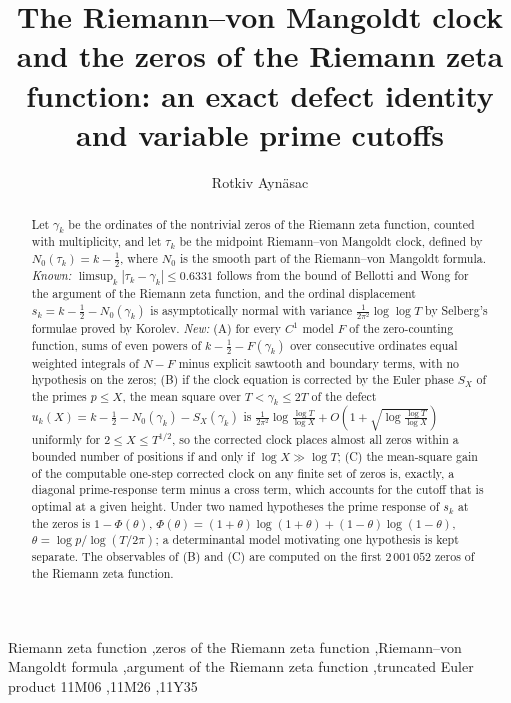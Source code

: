 \documentclass[preprint,12pt]{elsarticle}
\numberwithin{equation}{section}
\theoremstyle{plain}
\theoremstyle{definition}
\theoremstyle{remark}
\newcommand{\NO}{N_0}
\begin{document}
\begin{frontmatter}
\title{The Riemann--von Mangoldt clock and the zeros of the Riemann zeta function: an exact defect identity and variable prime cutoffs}
\author{Rotkiv Ayn\"asac}

\begin{abstract}
Let $\gamma_k$ be the ordinates of the nontrivial zeros of the Riemann zeta function, counted with multiplicity, and let $\tau_k$ be the midpoint Riemann--von Mangoldt clock, defined by $\NO(\tau_k)=k-\frac12$, where $\NO$ is the smooth part of the Riemann--von Mangoldt formula. \emph{Known:} $\limsup_k|\tau_k-\gamma_k|\le0.6331$ follows from the bound of Bellotti and Wong for the argument of the Riemann zeta function, and the ordinal displacement $s_k=k-\frac12-\NO(\gamma_k)$ is asymptotically normal with variance $\frac1{2\pi^2}\log\log T$ by Selberg's formulae proved by Korolev. \emph{New:} (A) for every $C^1$ model $F$ of the zero-counting function, sums of even powers of $k-\frac12-F(\gamma_k)$ over consecutive ordinates equal weighted integrals of $N-F$ minus explicit sawtooth and boundary terms, with no hypothesis on the zeros; (B) if the clock equation is corrected by the Euler phase $S_X$ of the primes $p\le X$, the mean square over $T<\gamma_k\le2T$ of the defect $u_k(X)=k-\frac12-\NO(\gamma_k)-S_X(\gamma_k)$ is $\frac1{2\pi^2}\log\frac{\log T}{\log X}+O(1+\sqrt{\log\frac{\log T}{\log X}})$ uniformly for $2\le X\le T^{1/2}$, so the corrected clock places almost all zeros within a bounded number of positions if and only if $\log X\gg\log T$; (C) the mean-square gain of the computable one-step corrected clock on any finite set of zeros is, exactly, a diagonal prime-response term minus a cross term, which accounts for the cutoff that is optimal at a given height. Under two named hypotheses the prime response of $s_k$ at the zeros is $1-\Phi(\theta)$, $\Phi(\theta)=(1+\theta)\log(1+\theta)+(1-\theta)\log(1-\theta)$, $\theta=\log p/\log(T/2\pi)$; a determinantal model motivating one hypothesis is kept separate. The observables of (B) and (C) are computed on the first $2\,001\,052$ zeros of the Riemann zeta function.
\end{abstract}

\begin{keyword}
Riemann zeta function \sep zeros of the Riemann zeta function \sep Riemann--von Mangoldt formula \sep argument of the Riemann zeta function \sep truncated Euler product
\MSC[2020] 11M06 \sep 11M26 \sep 11Y35
\end{keyword}
\end{frontmatter}
\end{document}

